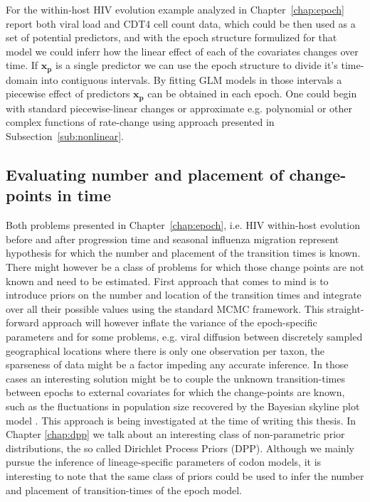 For the within-host HIV evolution example analyzed in Chapter~\ref{chap:epoch} \citet{Shankarappa1999} report both viral load and CDT4 cell count data, which could be then used as a set of potential predictors, and with the epoch structure formulized for that model we could inferr how the linear effect of each of the covariates changes over time.
If $\mathbf{x_{p}}$ is a single predictor we can use the epoch structure to divide it's time-domain into contiguous intervals.
By fitting GLM models in those intervals a piecewise effect of predictors $\mathbf{x_{p}}$ can be obtained in each epoch. 
One could begin with standard piecewise-linear changes or approximate e.g. polynomial or other complex functions of rate-change using approach presented in Subsection~\ref{sub:nonlinear}.

\subsection{Evaluating number and placement of change-points in time}

Both problems presented in Chapter~\ref{chap:epoch}, i.e. HIV within-host evolution before and after progression time and seasonal influenza migration represent hypothesis for which the number and placement of the transition times is known.
There might however be a class of problems for which those change points are not known and need to be estimated.
First approach that comes to mind is to introduce priors on the number and location of the transition times and integrate over all their possible values using the standard MCMC framework.
This straight-forward approach will however inflate the variance of the epoch-specific parameters and for some problems, e.g. viral diffusion between discretely sampled geographical locations where there is only one observation per taxon, the sparseness of data might be a factor impeding any accurate inference.
In those cases an interesting solution might be to couple the unknown transition-times between epochs to external covariates for which the change-points are known, such as  the fluctuations in population size recovered by the Bayesian skyline plot model \citep{Drummond2005}.
This approach is being investigated at the time of writing this thesis. %
In Chapter \ref{chap:dpp} we talk about an interesting class of non-parametric prior distributions, the so called Dirichlet Process Priors (DPP). 
Although we mainly pursue the inference of lineage-specific parameters of codon models, it is interesting to note that the same class of priors could be used to infer the number and placement of transition-times of the epoch model.

